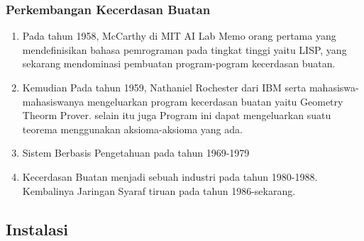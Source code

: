             \subsubsection{Perkembangan Kecerdasan Buatan}
            \begin{enumerate}
                \item Pada tahun 1958, McCarthy di MIT AI Lab Memo orang pertama yang mendefinisikan bahasa pemrograman pada tingkat tinggi yaitu LISP, yang sekarang mendominasi pembuatan program-pogram kecerdasan buatan.
                \item Kemudian Pada tahun 1959, Nathaniel Rochester dari IBM serta mahasiswa-mahasiswanya mengeluarkan program kecerdasan buatan yaitu Geometry Theorm Prover. selain itu juga Program ini dapat mengeluarkan suatu teorema menggunakan aksioma-aksioma yang ada.
                \item Sistem Berbasis Pengetahuan pada tahun 1969-1979
                \item  Kecerdasan Buatan menjadi sebuah industri pada tahun 1980-1988. Kembalinya Jaringan Syaraf tiruan pada tahun 1986-sekarang.
            \end{enumerate}
            \subsection{Instalasi}
